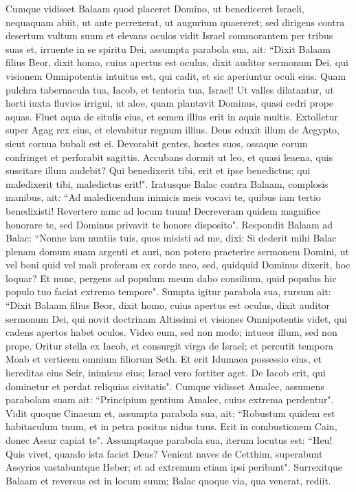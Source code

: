 \begin{biblechapter}  
\verse Cumque vidisset Balaam quod placeret Domino, ut benediceret Israeli, nequaquam abiit, ut ante perrexerat, ut augurium quaereret; sed dirigens contra desertum vultum suum 
\verse et elevans oculos vidit Israel commorantem per tribus suas et, irruente in se spiritu Dei, 
\verse assumpta parabola sua, ait: “Dixit Balaam filius Beor, dixit homo, cuius apertus est oculus, 
\verse dixit auditor sermonum Dei, qui visionem Omnipotentis intuitus est, qui cadit, et sic aperiuntur oculi eius. 
\verse Quam pulchra tabernacula tua, Iacob, et tentoria tua, Israel! 
\verse Ut valles dilatantur, ut horti iuxta fluvios irrigui, ut aloe, quam plantavit Dominus, quasi cedri prope aquas. 
\verse Fluet aqua de situlis eius, et semen illius erit in aquis multis. Extolletur super Agag rex eius, et elevabitur regnum illius. 
\verse Deus eduxit illum de Aegypto, sicut cornua bubali est ei. Devorabit gentes, hostes suos, ossaque eorum confringet et perforabit sagittis. 
\verse Accubans dormit ut leo, et quasi leaena, quis suscitare illum audebit? Qui benedixerit tibi, erit et ipse benedictus; qui maledixerit tibi, maledictus erit!". 
\verse Iratusque Balac contra Balaam, complosis manibus, ait: “Ad maledicendum inimicis meis vocavi te, quibus iam tertio benedixisti! 
\verse Revertere nunc ad locum tuum! Decreveram quidem magnifice honorare te, sed Dominus privavit te honore disposito". 
\verse Respondit Balaam ad Balac: “Nonne iam nuntiis tuis, quos misisti ad me, dixi: 
\verse Si dederit mihi Balac plenam domum suam argenti et auri, non potero praeterire sermonem Domini, ut vel boni quid vel mali proferam ex corde meo, sed, quidquid Dominus dixerit, hoc loquar? 
\verse Et nunc, pergens ad populum meum dabo consilium, quid populus hic populo tuo faciat extremo tempore". 
\verse Sumpta igitur parabola sua, rursum ait: “Dixit Balaam filius Beor, dixit homo, cuius apertus est oculus, 
\verse dixit auditor sermonum Dei, qui novit doctrinam Altissimi et visiones Omnipotentis videt, qui cadens apertos habet oculos. 
\verse Video eum, sed non modo; intueor illum, sed non prope. Oritur stella ex Iacob, et consurgit virga de Israel; et percutit tempora Moab et verticem omnium filiorum Seth. 
\verse Et erit Idumaea possessio eius, et hereditas eius Seir, inimicus eius; Israel vero fortiter aget. 
\verse De Iacob erit, qui dominetur et perdat reliquias civitatis". 
\verse Cumque vidisset Amalec, assumens parabolam suam ait: “Principium gentium Amalec, cuius extrema perdentur". 
\verse Vidit quoque Cinaeum et, assumpta parabola sua, ait: “Robustum quidem est habitaculum tuum, et in petra positus nidus tuus. 
\verse Erit in combustionem Cain, donec Assur capiat te". 
\verse Assumptaque parabola sua, iterum locutus est: “Heu! Quis vivet, quando ista faciet Deus? 
\verse Venient naves de Cetthim, superabunt Assyrios vastabuntque Heber; et ad extremum etiam ipsi peribunt". Surrexitque Balaam et reversus est in locum suum; Balac quoque via, qua venerat, rediit. 
\end{biblechapter}


